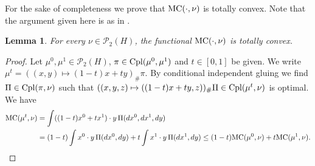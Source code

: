 \documentclass[a4paper]{amsart}
\numberwithin{theorem}{section}
\newtheorem{lemma}[theorem]{Lemma}
\theoremstyle{definition}
\newcommand{\cpl}{\textup{Cpl}}
\newcommand{\Pc}{\mathcal P}
\renewcommand{\H}{H}
\newcommand{\mc}{\textup{MC}}
\begin{document}
For the sake of completeness we prove that $\mc(\cdot,\nu)$ is totally convex. Note that the argument given here is as in \cite[Theorem~7.3.2]{AmGiSa08}.
\begin{lemma}\label{lem:MCtotcvx}
For every $\nu \in \Pc_2(\H)$, the functional $\mc(\cdot,\nu)$ is totally convex.  
\end{lemma}
\begin{proof}
Let $\mu^0,\mu^1 \in \Pc_2(\H)$,  $\pi \in \cpl(\mu^0,\mu^1)$ and $t \in [0,1]$ be given. We write   $\mu^t = ( (x,y) \mapsto (1-t)x+ty )_\# \pi$. By conditional independent gluing we find  $\Pi \in \cpl(\pi, \nu)$ such that $(  (x,y,z) \mapsto ((1-t)x+ty,z) )_\# \Pi \in \cpl(\mu^t,\nu)$ is optimal. We have 
\begin{align*}
\mc(\mu^t,\nu) &= \int   ((1-t)x^0+tx^1) \cdot y \, \Pi(dx^0,dx^1,dy) \\&= (1-t) \int  x^0 \cdot y \,  \Pi(dx^0,dy) + t \int  x^1 \cdot y \,  \Pi(dx^1,dy) 
\le  (1-t)\mc(\mu^0,\nu) +t \mc(\mu^1,\nu). \qedhere
\end{align*}
\end{proof}
\end{document}
